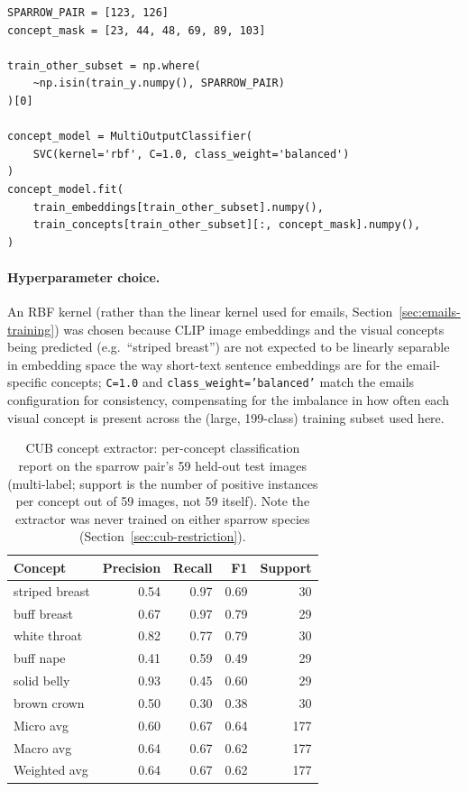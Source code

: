 \documentclass[11pt]{article}
\newcommand{\code}[1]{\texttt{#1}}
\begin{document}
\begin{lstlisting}
SPARROW_PAIR = [123, 126]
concept_mask = [23, 44, 48, 69, 89, 103]

train_other_subset = np.where(
    ~np.isin(train_y.numpy(), SPARROW_PAIR)
)[0]

concept_model = MultiOutputClassifier(
    SVC(kernel='rbf', C=1.0, class_weight='balanced')
)
concept_model.fit(
    train_embeddings[train_other_subset].numpy(),
    train_concepts[train_other_subset][:, concept_mask].numpy(),
)
\end{lstlisting}

\paragraph{Hyperparameter choice.} An RBF kernel (rather than the linear
kernel used for emails, Section~\ref{sec:emails-training}) was chosen
because CLIP image embeddings and the visual concepts being predicted
(e.g.\ ``striped breast'') are not expected to be linearly separable in
embedding space the way short-text sentence embeddings are for the
email-specific concepts; \code{C=1.0} and \code{class\_weight='balanced'}
match the emails configuration for consistency, compensating for the
imbalance in how often each visual concept is present across the (large,
199-class) training subset used here.

\begin{table}[h]
\centering
\begin{tabular}{lrrrr}
\toprule
Concept & Precision & Recall & F1 & Support \\
\midrule
striped breast & 0.54 & 0.97 & 0.69 & 30 \\
buff breast    & 0.67 & 0.97 & 0.79 & 29 \\
white throat   & 0.82 & 0.77 & 0.79 & 30 \\
buff nape      & 0.41 & 0.59 & 0.49 & 29 \\
solid belly    & 0.93 & 0.45 & 0.60 & 29 \\
brown crown    & 0.50 & 0.30 & 0.38 & 30 \\
\midrule
Micro avg    & 0.60 & 0.67 & 0.64 & 177 \\
Macro avg    & 0.64 & 0.67 & 0.62 & 177 \\
Weighted avg & 0.64 & 0.67 & 0.62 & 177 \\
\bottomrule
\end{tabular}
\caption{CUB concept extractor: per-concept classification report on the
sparrow pair's 59 held-out test images (multi-label; support is the number
of positive instances per concept out of 59 images, not 59 itself). Note
the extractor was never trained on either sparrow species
(Section~\ref{sec:cub-restriction}).}
\end{table}
\end{document}
